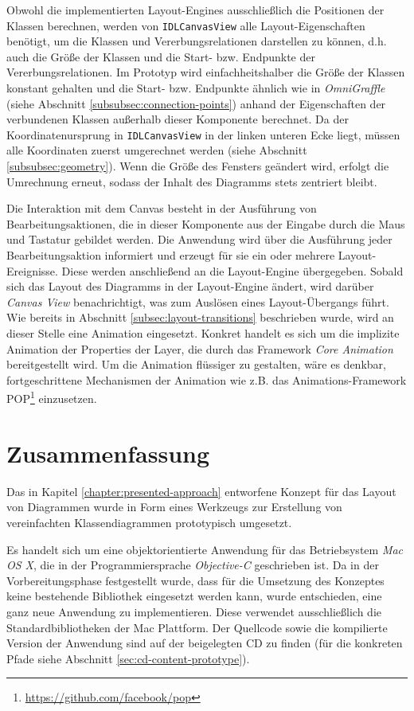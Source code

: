 Obwohl die implementierten Layout-Engines ausschließlich die Positionen der Klassen berechnen, werden von \texttt{IDLCanvasView} alle Layout-Eigenschaften benötigt, um die Klassen und Vererbungsrelationen darstellen zu können, d.h. auch die Größe der Klassen und die Start- bzw. Endpunkte der Vererbungsrelationen. Im Prototyp wird einfachheitshalber die Größe der Klassen konstant gehalten und die Start- bzw. Endpunkte ähnlich wie in \textit{OmniGraffle} (siehe Abschnitt \ref{subsubsec:connection-points}) anhand der Eigenschaften der verbundenen Klassen außerhalb dieser Komponente berechnet. Da der Koordinatenursprung in \texttt{IDLCanvasView} in der linken unteren Ecke liegt, müssen alle Koordinaten zuerst umgerechnet werden (siehe Abschnitt \ref{subsubsec:geometry}). Wenn die Größe des Fensters geändert wird, erfolgt die Umrechnung erneut, sodass der Inhalt des Diagramms stets zentriert bleibt.

Die Interaktion mit dem Canvas besteht in der Ausführung von Bearbeitungsaktionen, die in dieser Komponente aus der Eingabe durch die Maus und Tastatur gebildet werden. Die Anwendung wird über die Ausführung jeder Bearbeitungsaktion informiert und erzeugt für sie ein oder mehrere Layout-Ereignisse. Diese werden anschließend an die Layout-Engine übergegeben. Sobald sich das Layout des Diagramms in der Layout-Engine ändert, wird darüber \textit{Canvas View} benachrichtigt, was zum Auslösen eines Layout-Übergangs führt. Wie bereits in Abschnitt \ref{subsec:layout-transitions} beschrieben wurde, wird an dieser Stelle eine Animation eingesetzt. Konkret handelt es sich um die implizite Animation der Properties der Layer, die durch das Framework \textit{Core Animation} bereitgestellt wird. Um die Animation flüssiger zu gestalten, wäre es denkbar, fortgeschrittene Mechanismen der Animation wie z.B. das Animations-Framework POP\footnote{\url{https://github.com/facebook/pop}} einzusetzen.

\section{Zusammenfassung}
\label{sec:prototype-summary}

Das in Kapitel \ref{chapter:presented-approach} entworfene Konzept für das Layout von Diagrammen wurde in Form eines Werkzeugs zur Erstellung von vereinfachten Klassendiagrammen prototypisch umgesetzt.

Es handelt sich um eine objektorientierte Anwendung für das Betriebsystem \textit{Mac OS X}, die in der Programmiersprache \textit{Objective-C} geschrieben ist. Da in der Vorbereitungsphase festgestellt wurde, dass für die Umsetzung des Konzeptes keine bestehende Bibliothek eingesetzt werden kann, wurde entschieden, eine ganz neue Anwendung zu implementieren. Diese verwendet ausschließlich die Standardbibliotheken der Mac Plattform. Der Quellcode sowie die kompilierte Version der Anwendung sind auf der beigelegten CD zu finden (für die konkreten Pfade siehe Abschnitt \ref{sec:cd-content-prototype}).

